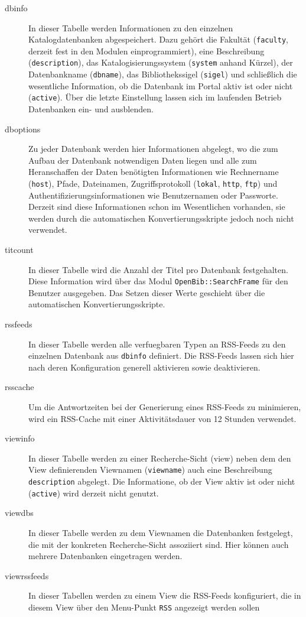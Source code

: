 \documentclass[11pt, twoside, a4paper, BCOR8mm, DIV12, bibtotoc,idxtotoc]{scrbook}
\begin{document}
\begin{description}
\item[dbinfo] In dieser Tabelle werden Informationen zu den einzelnen
  Katalogdatenbanken ab\-ge\-spei\-chert. Dazu gehört die Fakultät
  (\texttt{faculty}, derzeit fest in den Modulen einprogrammiert),
  eine Beschreibung (\texttt{description}), das Katalogisierungssystem
  (\texttt{system} anhand Kürzel), der Datenbankname
  (\texttt{dbname}), das Bibliothekssigel (\texttt{sigel}) und
  schließlich die wesentliche Information, ob die Daten\-bank im Portal
  aktiv ist oder nicht (\texttt{active}). Über die letzte Einstellung
  lassen sich im laufenden Betrieb Daten\-banken ein- und ausblenden.
\item[dboptions] Zu jeder Daten\-bank werden hier Informationen
  abgelegt, wo die zum Aufbau der Daten\-bank notwendigen Daten liegen
  und alle zum Heranschaffen der Daten benötigten Informationen wie
  Rechnername (\texttt{host}), Pfade, Dateinamen, Zugriffsprotokoll
  (\texttt{lokal}, \texttt{http}, \texttt{ftp}) und
  Authentifizierungsinformationen wie Benutzernamen oder Passworte.
  Derzeit sind diese Informationen schon im Wesentlichen vorhanden,
  sie werden durch die automatischen Konvertierungsskripte jedoch noch
  nicht verwendet.
\item[titcount] In dieser Tabelle wird die Anzahl der Titel pro
  Daten\-bank festgehalten. Diese Information wird über das Modul
  \texttt{OpenBib::SearchFrame} für den Benutzer ausgegeben. Das Setzen
  dieser Werte geschieht über die automatischen
  Konvertierungsskripte.
\item[rssfeeds] In dieser Tabelle werden alle verfuegbaren Typen an RSS-Feeds
  zu den einzelnen Daten\-bank aus \texttt{dbinfo} definiert. Die
  RSS-Feeds lassen sich hier nach deren Konfiguration generell
  aktivieren sowie deaktivieren.
\item[rsscache] Um die Antwortzeiten bei der Generierung eines
  RSS-Feeds zu minimieren, wird ein RSS-Cache mit einer
  Aktivitätsdauer von 12 Stunden verwendet.
\item[viewinfo] In dieser Tabelle werden zu einer Recherche-Sicht
  (view) neben dem den View de\-fi\-nier\-enden Viewnamen
  (\texttt{viewname}) auch eine Beschreibung \texttt{description}
  abgelegt. Die Informatione, ob der View aktiv ist oder nicht
  (\texttt{active}) wird derzeit nicht genutzt.
\item[viewdbs] In dieser Tabelle werden zu dem Viewnamen die Daten\-banken
  festgelegt, die mit der konkreten Recherche-Sicht assoziiert
  sind. Hier können auch mehrere Daten\-banken ein\-ge\-tra\-gen werden.
\item[viewrssfeeds] In dieser Tabellen werden zu einem View die
  RSS-Feeds konfiguriert, die in diesem View über den Menu-Punkt
  \texttt{RSS} angezeigt werden sollen

\end{description}
\end{document}

